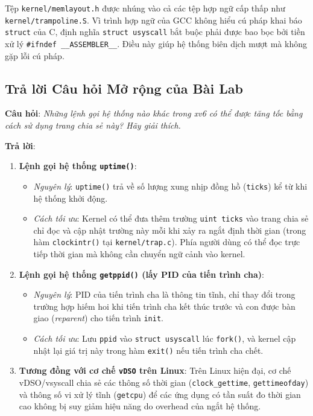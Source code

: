 \begin{calloutnote}
    Tệp \texttt{kernel/memlayout.h} được nhúng vào cả các tệp hợp ngữ cấp thấp như \texttt{kernel/trampoline.S}. Vì trình hợp ngữ của GCC không hiểu cú pháp khai báo \texttt{struct} của C, định nghĩa \texttt{struct usyscall} bắt buộc phải được bao bọc bởi tiền xử lý \texttt{\#ifndef \_\_ASSEMBLER\_\_}. Điều này giúp hệ thống biên dịch mượt mà không gặp lỗi cú pháp.
\end{calloutnote}

\subsection{Trả lời Câu hỏi Mở rộng của Bài Lab}
\textbf{Câu hỏi}: \textit{Những lệnh gọi hệ thống nào khác trong xv6 có thể được tăng tốc bằng cách sử dụng trang chia sẻ này? Hãy giải thích.}

\textbf{Trả lời}:
\begin{enumerate}
    \item \textbf{Lệnh gọi hệ thống \texttt{uptime()}}:
    \begin{itemize}
        \item \textit{Nguyên lý}: \texttt{uptime()} trả về số lượng xung nhịp đồng hồ (\texttt{ticks}) kể từ khi hệ thống khởi động. 
        \item \textit{Cách tối ưu}: Kernel có thể đưa thêm trường \texttt{uint ticks} vào trang chia sẻ chỉ đọc và cập nhật trường này mỗi khi xảy ra ngắt định thời gian (trong hàm \texttt{clockintr()} tại \texttt{kernel/trap.c}). Phía người dùng có thể đọc trực tiếp thời gian mà không cần chuyển ngữ cảnh vào kernel.
    \end{itemize}
    \item \textbf{Lệnh gọi hệ thống \texttt{getppid()} (lấy PID của tiến trình cha)}:
    \begin{itemize}
        \item \textit{Nguyên lý}: PID của tiến trình cha là thông tin tĩnh, chỉ thay đổi trong trường hợp hiếm hoi khi tiến trình cha kết thúc trước và con được bàn giao (\textit{reparent}) cho tiến trình \texttt{init}.
        \item \textit{Cách tối ưu}: Lưu \texttt{ppid} vào \texttt{struct usyscall} lúc \texttt{fork()}, và kernel cập nhật lại giá trị này trong hàm \texttt{exit()} nếu tiến trình cha chết.
    \end{itemize}
    \item \textbf{Tương đồng với cơ chế \texttt{vDSO} trên Linux}:
    Trên Linux hiện đại, cơ chế vDSO/vsyscall chia sẻ các thông số thời gian (\texttt{clock\_gettime}, \texttt{gettimeofday}) và thông số vi xử lý tĩnh (\texttt{getcpu}) để các ứng dụng có tần suất đo thời gian cao không bị suy giảm hiệu năng do overhead của ngắt hệ thống.
\end{enumerate}

